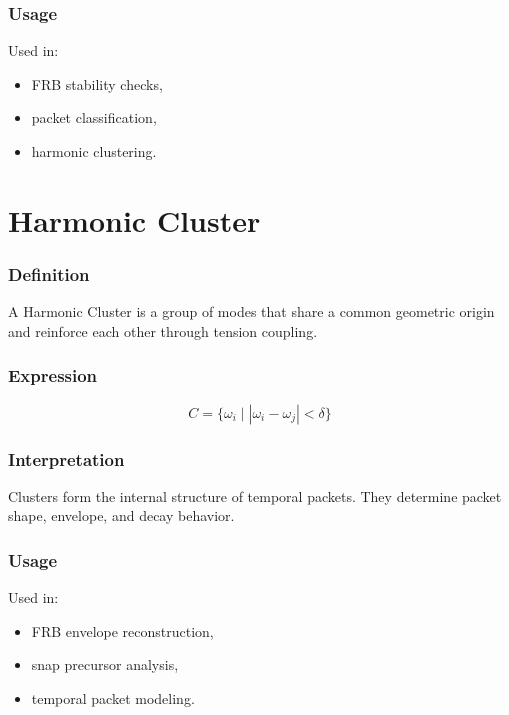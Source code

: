 \documentclass[12pt,oneside]{book}
\begin{document}
\subsubsection{Usage}
Used in:
\begin{itemize}
    \item FRB stability checks,
    \item packet classification,
    \item harmonic clustering.
\end{itemize}


\section{Harmonic Cluster}

\subsubsection{Definition}
A Harmonic Cluster is a group of modes that share a common geometric origin and reinforce each
other through tension coupling.

\subsubsection{Expression}


\[
C = \{ \omega_i \mid |\omega_i - \omega_j| < \delta \}
\]



\subsubsection{Interpretation}
Clusters form the internal structure of temporal packets.  
They determine packet shape, envelope, and decay behavior.

\subsubsection{Usage}
Used in:
\begin{itemize}
    \item FRB envelope reconstruction,
    \item snap precursor analysis,
    \item temporal packet modeling.
\end{itemize}
\end{document}
